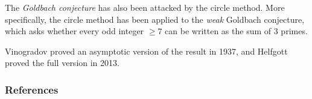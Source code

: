 
\begin{frame}\frametitle{\insertsubsection}
The \textit{Goldbach conjecture} has also been attacked by the circle method. More specifically, the circle method has been applied to the \textit{weak} Goldbach conjecture, which asks whether every odd integer \(\geq 7\) can be written as the sum of \(3\) primes.

Vinogradov proved an asymptotic version of the result in 1937, and Helfgott proved the full version in 2013.
\end{frame}

\begin{frame}\frametitle{References}
\printbibliography
\end{frame}
